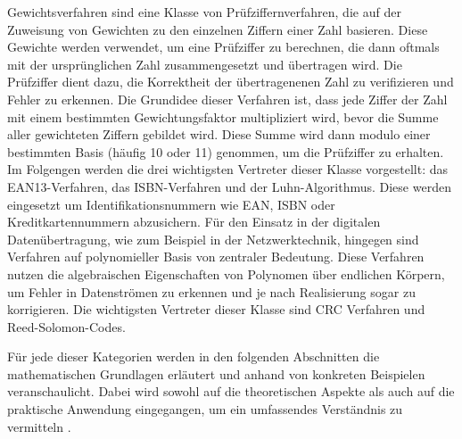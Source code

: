 Gewichtsverfahren sind eine Klasse von Prüfziffernverfahren, die auf der Zuweisung von Gewichten zu den einzelnen Ziffern einer Zahl basieren. Diese Gewichte werden verwendet, um eine Prüfziffer zu berechnen, die dann oftmals mit der ursprünglichen Zahl zusammengesetzt und übertragen wird. Die Prüfziffer dient dazu, die Korrektheit der übertragenenen Zahl zu verifizieren und Fehler zu erkennen.
Die Grundidee dieser Verfahren ist, dass jede Ziffer der Zahl mit einem bestimmten Gewichtungsfaktor multipliziert wird, bevor die Summe aller gewichteten Ziffern gebildet wird. Diese Summe wird dann modulo einer bestimmten Basis (häufig 10 oder 11) genommen, um die Prüfziffer zu erhalten. Im Folgengen werden die drei wichtigsten Vertreter dieser Klasse vorgestellt: das EAN13-Verfahren, das ISBN-Verfahren und der Luhn-Algorithmus.
Diese werden eingesetzt um Identifikationsnummern wie EAN, ISBN oder Kreditkartennummern abzusichern. Für den Einsatz in der digitalen Datenübertragung, wie zum Beispiel in der Netzwerktechnik, hingegen sind Verfahren auf polynomieller Basis von zentraler Bedeutung. Diese Verfahren nutzen die algebraischen Eigenschaften von Polynomen über endlichen Körpern, um Fehler in Datenströmen zu erkennen und je nach Realisierung sogar zu korrigieren. Die wichtigsten Vertreter dieser Klasse sind \ac{CRC} Verfahren und Reed-Solomon-Codes.

Für jede dieser Kategorien werden in den folgenden Abschnitten die mathematischen Grundlagen erläutert und anhand von konkreten Beispielen veranschaulicht. Dabei wird sowohl auf die theoretischen Aspekte als auch auf die praktische Anwendung eingegangen, um ein umfassendes Verständnis zu vermitteln \cite{Hoffmann2023-sv}.
